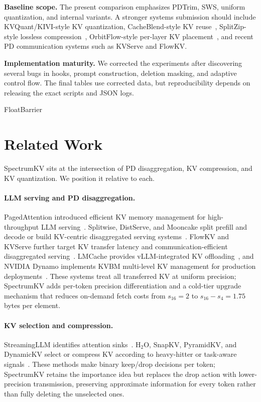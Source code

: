 \documentclass[11pt]{article}
\newcommand{\method}{SpectrumKV}
\theoremstyle{plain}
\theoremstyle{definition}
\begin{document}
\textbf{Baseline scope.}  The present comparison emphasizes PDTrim, SWS, uniform quantization, and internal variants.  A stronger systems submission should include KVQuant/KIVI-style KV quantization, CacheBlend-style KV reuse~\citep{cacheblend}, SplitZip-style lossless compression~\citep{splitzip}, OrbitFlow-style per-layer KV placement~\citep{orbitflow}, and recent PD communication systems such as KVServe and FlowKV.

\textbf{Implementation maturity.}  We corrected the experiments after discovering several bugs in hooks, prompt construction, deletion masking, and adaptive control flow.  The final tables use corrected data, but reproducibility depends on releasing the exact scripts and JSON logs.

FloatBarrier
\section{Related Work}
\label{sec:related}

\method{} sits at the intersection of PD disaggregation, KV compression, and KV quantization.  We position it relative to each.

\paragraph{LLM serving and PD disaggregation.}
PagedAttention introduced efficient KV memory management for high-throughput LLM serving~\citep{pagedattention}.  Splitwise, DistServe, and Mooncake split prefill and decode or build KV-centric disaggregated serving systems~\citep{splitwise,distserve,mooncake}.  FlowKV and KVServe further target KV transfer latency and communication-efficient disaggregated serving~\citep{flowkv,kvserve}.  LMCache provides vLLM-integrated KV offloading~\citep{lmcache}, and NVIDIA Dynamo implements KVBM multi-level KV management for production deployments~\citep{nvidiadynamo}.  These systems treat all transferred KV at uniform precision; \method{} adds per-token precision differentiation and a cold-tier upgrade mechanism that reduces on-demand fetch costs from $s_{16}=2$ to $s_{16}-s_4=1.75$ bytes per element.

\paragraph{KV selection and compression.}
StreamingLLM identifies attention sinks~\citep{streamingllm}.  H$_2$O, SnapKV, PyramidKV, and DynamicKV select or compress KV according to heavy-hitter or task-aware signals~\citep{h2o,snapkv,pyramidkv,dynamickv}.  These methods make binary keep/drop decisions per token; \method{} retains the importance idea but replaces the drop action with lower-precision transmission, preserving approximate information for every token rather than fully deleting the unselected ones.
\end{document}
